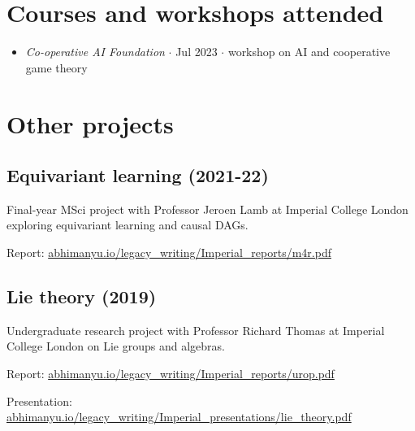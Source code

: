 \documentclass{article}
\newenvironment{relatedwork}
   {
     \begin{mdframed}[
       leftmargin=1cm,
       rightmargin=0cm,
       innerleftmargin=10pt,
       innerrightmargin=0pt,
       innertopmargin=0.5em,
       innerbottommargin=0.5em,
       linewidth=1pt,
       linecolor=gray,
       topline=false,
       bottomline=false,
       rightline=false
     ]
     \footnotesize
   }
   {
     \end{mdframed}
   }
\begin{document}
\section*{Courses and workshops attended}

\begin{itemize}

    \item \emph{Co-operative AI Foundation} $\cdot$ Jul 2023 $\cdot$ workshop on AI and cooperative game theory

\end{itemize}

\section*{Other projects}

\subsection*{Equivariant learning (2021-22)}

Final-year MSci project with Professor Jeroen Lamb at Imperial College London exploring equivariant learning and causal DAGs.

Report: \href{https://abhimanyu.io/legacy_writing/Imperial_reports/m4r.pdf}{abhimanyu.io/legacy\_writing/Imperial\_reports/m4r.pdf}

\subsection*{Lie theory (2019)}

Undergraduate research project with Professor Richard Thomas at Imperial College London on Lie groups and algebras.

Report: \href{https://abhimanyu.io/legacy_writing/Imperial_reports/urop.pdf}{abhimanyu.io/legacy\_writing/Imperial\_reports/urop.pdf}

Presentation: \href{https://abhimanyu.io/legacy_writing/Imperial_presentations/lie_theory.pdf}{abhimanyu.io/legacy\_writing/Imperial\_presentations/lie\_theory.pdf}

\end{document}
